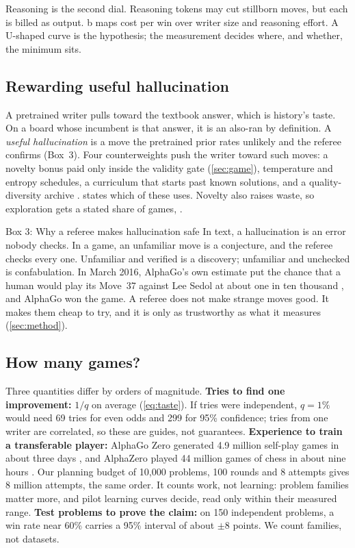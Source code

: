 Reasoning is the second dial. Reasoning tokens may cut stillborn moves, but
each is billed as output. b maps cost per win over writer
size and reasoning effort. A U-shaped curve is the hypothesis; the
measurement decides where, and whether, the minimum sits.

\subsection{Rewarding useful hallucination}\label{sub:price-hallucination}

A pretrained writer pulls toward the textbook answer, which is history's
taste. On a board whose incumbent is that answer, it is an also-ran by
definition. A \emph{useful hallucination} is a move the pretrained prior rates
unlikely and the referee confirms (Box~3). Four counterweights push the
writer toward such moves: a novelty bonus paid only inside the validity gate
(\cref{sec:game}), temperature and entropy schedules, a curriculum that
starts past known solutions, and a quality-diversity archive
\citep{lehman2011novelty,mouret2015mapelites}.  states which
of these \EZ{} uses. Novelty also raises waste, so exploration gets a stated
share of games, .

\begin{explainer}{Box 3: Why a referee makes hallucination safe}
  \label{box:hallucination}
  In text, a hallucination is an error nobody checks. In a game, an
  unfamiliar move is a conjecture, and the referee checks every one.
  Unfamiliar and verified is a discovery; unfamiliar and unchecked is
  confabulation. In March 2016, AlphaGo's own estimate put the chance that a
  human would play its Move~37 against Lee Sedol at about one in ten
  thousand \citep{metz2016twomoves}, and AlphaGo won the game. A referee does
  not make strange moves good. It makes them cheap to try, and it is only as
  trustworthy as what it measures (\cref{sec:method}).
\end{explainer}

\subsection{How many games?}\label{sub:price-games}

Three quantities differ by orders of magnitude.
\textbf{Tries to find one improvement:} $1/q$ on average (\cref{eq:taste}).
If tries were independent, $q = 1\%$ would need 69 tries for even odds and
299 for 95\% confidence; tries from one writer are correlated, so these are
guides, not guarantees.
\textbf{Experience to train a transferable player:} AlphaGo Zero generated
4.9 million self-play games in about three days \citep{silver2017mastering},
and AlphaZero played 44 million games of chess in about nine hours
\citep{silver2018general}. Our planning budget of 10,000
problems, 100 rounds and 8 attempts gives 8 million attempts, the same order.
It counts work, not learning: problem families matter more, and pilot
learning curves decide, read only within their measured range.
\textbf{Test problems to prove the claim:} on 150 independent problems, a win
rate near 60\% carries a 95\% interval of about $\pm 8$ points. We count
families, not datasets.

